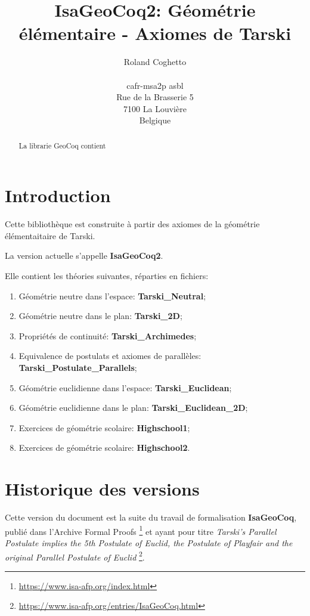 \documentclass[8pt,a4paper]{article}
\theoremstyle{plain}
\begin{document}
\title{IsaGeoCoq2: Géométrie élémentaire - Axiomes de Tarski}
\author{Roland Coghetto\\
  \\
  cafr-msa2p asbl\\
  Rue de la Brasserie 5\\
  7100 La Louvière\\
Belgique}
\maketitle
\begin{abstract}
  La librarie GeoCoq contient
\end{abstract}
\tableofcontents
\section{Introduction}
Cette bibliothèque est construite à partir des axiomes de la géométrie élémentaitaire de Tarski.

La version actuelle s'appelle \textbf{IsaGeoCoq2}.

Elle contient les théories suivantes, réparties en fichiers:
\begin{enumerate}
\item Géométrie neutre dans l'espace: \textbf{Tarski\_Neutral};
\item Géométrie neutre dans le plan: \textbf{Tarski\_2D};
  \item Propriétés de continuité: \textbf{Tarski\_Archimedes};
  \item Equivalence de postulats et axiomes de parallèles: \textbf{Tarski\_Postulate\_Parallels};
  \item Géométrie euclidienne dans l'espace: \textbf{Tarski\_Euclidean};
  \item Géométrie euclidienne dans le plan: \textbf{Tarski\_Euclidean\_2D};
  \item Exercices de géométrie scolaire: \textbf{Highschool1};
    \item Exercices de géométrie scolaire: \textbf{Highschool2}.
  \end{enumerate}

\section{Historique des versions}
Cette version du document est la suite du travail de formalisation \textbf{IsaGeoCoq},
publié dans l'Archive Formal Proofs
\footnote{\url{https://www.isa-afp.org/index.html}} et ayant pour titre
\textit{Tarski's Parallel Postulate implies the 5th Postulate of Euclid,
  the Postulate of Playfair and the original Parallel Postulate of Euclid}
\cite{IsaGeoCoq-AFP}
\footnote{\url{https://www.isa-afp.org/entries/IsaGeoCoq.html}}.
\end{document}
